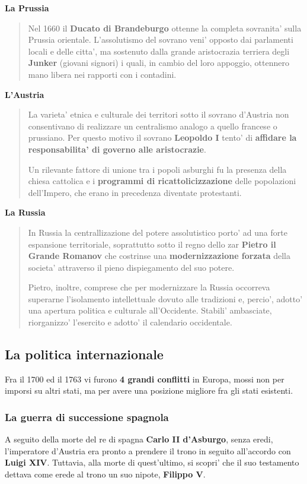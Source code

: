 \documentclass{article}
\begin{document}
{{    \textbf{La Prussia}
    \begin{quote}
      Nel 1660 il \textbf{Ducato di Brandeburgo} ottenne la completa sovranita' sulla Prussia orientale. L'assolutismo del sovrano veni' opposto dai parlamenti locali e delle citta', ma sostenuto dalla grande aristocrazia terriera degli \textbf{Junker} \small{(giovani signori)} i quali, in cambio del loro appoggio, ottennero mano libera nei rapporti con i contadini.
    \end{quote}

    \textbf{L'Austria}
    \begin{quote}
      La varieta' etnica e culturale dei territori sotto il sovrano d'Austria non consentivano di realizzare un centralismo analogo a quello francese o prussiano. Per questo motivo il sovrano \textbf{Leopoldo I} tento' di \textbf{affidare la responsabilita' di governo alle aristocrazie}.

      Un rilevante fattore di unione tra i popoli asburghi fu la presenza della chiesa cattolica e i \textbf{programmi di ricattolicizzazione} delle popolazioni dell'Impero, che erano in precedenza diventate protestanti.
    \end{quote}

    \textbf{La Russia}
    \begin{quote}
      In Russia la centrallizazione del potere assolutistico porto' ad una forte espansione territoriale, soprattutto sotto il regno dello zar \textbf{Pietro il Grande Romanov} che costrinse una \textbf{modernizzazione forzata} della societa' attraverso il pieno dispiegamento del suo potere.

      Pietro, inoltre, comprese che per modernizzare la Russia occorreva superarne l'isolamento intellettuale dovuto alle tradizioni e, percio', adotto' una apertura politica e culturale all'Occidente. Stabili' ambasciate, riorganizzo' l'esercito e adotto' il calendario occidentale.
    \end{quote}

    \subsection{La politica internazionale}
    Fra il 1700 ed il 1763 vi furono \textbf{4 grandi conflitti} in Europa, mossi non per imporsi su altri stati, ma per avere una posizione migliore fra gli stati esistenti.

    \subsubsection{La guerra di successione spagnola}
    A seguito della morte del re di spagna \textbf{Carlo II d'Asburgo}, senza eredi, l'imperatore d'Austria era pronto a prendere il trono in seguito all'accordo con \textbf{Luigi XIV}. Tuttavia, alla morte di quest'ultimo, si scopri' che il suo testamento dettava come erede al trono un suo nipote, \textbf{Filippo V}.

}}
\end{document}
